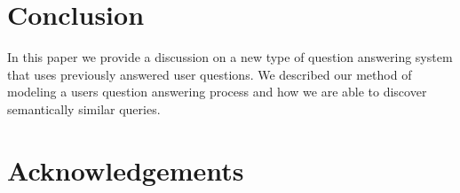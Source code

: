
\section{Conclusion}

In this paper we provide a discussion on a new type of question
answering system that uses previously answered user questions.  We
described our method of modeling a users question answering process
and how we are able to discover semantically similar queries.


\section{Acknowledgements}
